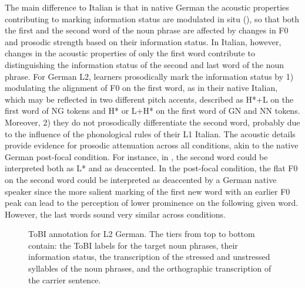 The main difference to Italian is that in native German the acoustic properties contributing to marking information status are modulated in situ (\citealt{KüglerCalhoun2020}), so that both the first and the second word of the noun phrase are affected by changes in F0 and prosodic strength based on their information status. In Italian, however, changes in the acoustic properties of only the first word contribute to distinguishing the information status of the second and last word of the noun phrase. For German L2, learners prosodically mark the information status by 1) modulating the alignment of F0 on the first word, as in their native Italian, which may be reflected in two different pitch accents, described as H*+L on the first word of NG tokens and H* or L+H* on the first word of GN and NN tokens. Moreover, 2) they do not prosodically differentiate the second word, probably due to the influence of the phonological rules of their L1 Italian. The acoustic details provide evidence for prosodic attenuation across all conditions, akin to the native German post-focal condition. For instance, in , the second word could be interpreted both as L* and as deaccented. In the post-focal condition, the flat F0 on the second word could be interpreted as deaccented by a German native speaker since the more salient marking of the first new word with an earlier F0 peak can lead to the perception of lower prominence on the following given word. However, the last words sound very similar across conditions.

\begin{figure}



\caption{\label{fig:2.30} ToBI annotation for L2 German. The tiers from top to bottom contain: the ToBI labels for the target noun phrases, their information status, the transcription of the stressed and unstressed syllables of the noun phrases, and the orthographic transcription of the carrier sentence.}
\end{figure}


